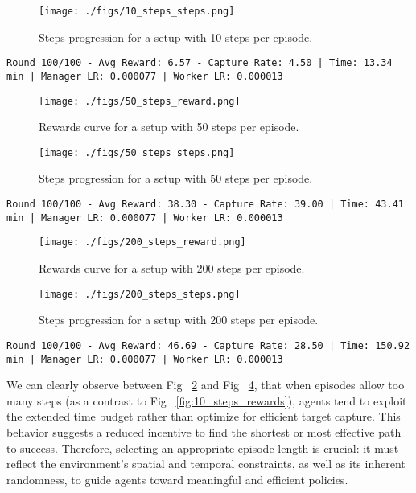 \documentclass[12pt,a4paper,twoside,openany]{book}
\begin{document}
\begin{figure}[H]
\centering
\texttt{[image: ./figs/10\_steps\_steps.png]}
\captionsetup{font=small}
\caption{Steps progression for a setup with 10 steps per episode.}
\label{fig:10_steps_steps}
\end{figure}

\begin{lstlisting}
Round 100/100 - Avg Reward: 6.57 - Capture Rate: 4.50 | Time: 13.34 min | Manager LR: 0.000077 | Worker LR: 0.000013 
\end{lstlisting}

\begin{figure}[H]
\centering
\texttt{[image: ./figs/50\_steps\_reward.png]}
\captionsetup{font=small}
\caption{Rewards curve for a setup with 50 steps per episode.}
\label{fig:50_steps_rewards}
\end{figure}

\begin{figure}[H]
\centering
\texttt{[image: ./figs/50\_steps\_steps.png]}
\captionsetup{font=small}
\caption{Steps progression for a setup with 50 steps per episode.}
\label{fig:50_steps_steps}
\end{figure}

\begin{lstlisting}
Round 100/100 - Avg Reward: 38.30 - Capture Rate: 39.00 | Time: 43.41 min | Manager LR: 0.000077 | Worker LR: 0.000013 
\end{lstlisting}

\begin{figure}[H]
\centering
\texttt{[image: ./figs/200\_steps\_reward.png]}
\captionsetup{font=small}
\caption{Rewards curve for a setup with 200 steps per episode.}
\label{fig:200_steps_rewards}
\end{figure}

\begin{figure}[H]
\centering
\texttt{[image: ./figs/200\_steps\_steps.png]}
\captionsetup{font=small}
\caption{Steps progression for a setup with 200 steps per episode.}
\label{fig:200_steps_steps}
\end{figure}

\begin{lstlisting}
Round 100/100 - Avg Reward: 46.69 - Capture Rate: 28.50 | Time: 150.92 min | Manager LR: 0.000077 | Worker LR: 0.000013 
\end{lstlisting}

We can clearly observe between Fig ~\ref{fig:50_steps_rewards} and Fig ~\ref{fig:200_steps_rewards}, that when episodes allow too many steps (as a contrast to Fig ~\ref{fig:10_steps_rewards}), agents tend to exploit the extended time budget rather than optimize for efficient target capture. This behavior suggests a reduced incentive to find the shortest or most effective path to success. Therefore, selecting an appropriate episode length is crucial: it must reflect the environment’s spatial and temporal constraints, as well as its inherent randomness, to guide agents toward meaningful and efficient policies. 
\end{document}
